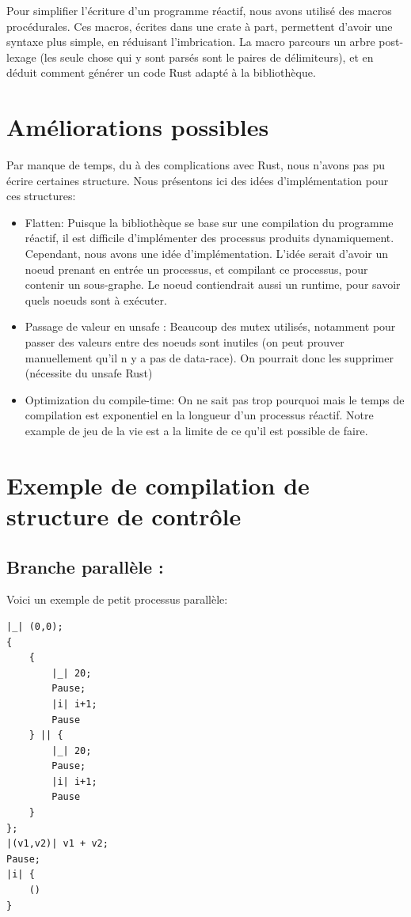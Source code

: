 \documentclass[a4paper]{article}
\renewcommand{\(}{\left(}
\renewcommand{\)}{\right)}
\begin{document}
Pour simplifier l'écriture d'un programme réactif, nous avons utilisé des macros
procédurales. Ces macros, écrites dans une crate à part, permettent d'avoir une
syntaxe plus simple, en réduisant l'imbrication. La macro parcours un arbre
post-lexage (les seule chose qui y sont parsés sont le paires de délimiteurs),
et en déduit comment générer un code Rust adapté à la bibliothèque.

\section{Améliorations possibles}

Par manque de temps, du à des complications avec Rust, nous n'avons pas pu
écrire certaines structure. Nous présentons ici des idées d'implémentation pour
ces structures:

\begin{itemize}
\item Flatten: Puisque la bibliothèque se base sur une compilation du programme
  réactif, il est difficile d'implémenter des processus produits dynamiquement.
  Cependant, nous avons une idée d'implémentation. L'idée serait d'avoir un
  noeud prenant en entrée un processus, et compilant ce processus, pour contenir
  un sous-graphe. Le noeud contiendrait aussi un runtime, pour savoir quels
  noeuds sont à exécuter.
\item Passage de valeur en unsafe : Beaucoup des mutex utilisés, notamment pour
  passer des valeurs entre des noeuds sont inutiles (on peut prouver manuellement
  qu'il n y a pas de data-race). On pourrait donc les supprimer (nécessite du
  unsafe Rust)
\item Optimization du compile-time: On ne sait pas trop pourquoi mais le temps
  de compilation est exponentiel en la longueur d'un processus réactif. Notre
  example de jeu de la vie est a la limite de ce qu'il est possible de faire.
\end{itemize}

\section{Exemple de compilation de structure de contrôle}

\subsection{Branche parallèle :}

Voici un exemple de petit processus parallèle:
\begin{verbatim}
|_| (0,0);
{
    {
        |_| 20;
        Pause;
        |i| i+1;
        Pause
    } || {
        |_| 20;
        Pause;
        |i| i+1;
        Pause
    }
};
|(v1,v2)| v1 + v2;
Pause;
|i| {
    ()
}
\end{verbatim}
\end{document}

